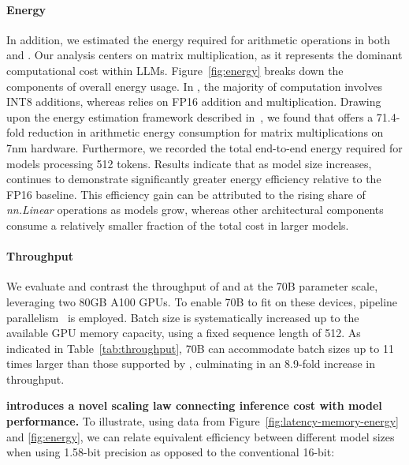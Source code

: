 \paragraph{Energy}

In addition, we estimated the energy required for arithmetic operations in both  and . Our analysis centers on matrix multiplication, as it represents the dominant computational cost within LLMs. Figure~\ref{fig:energy} breaks down the components of overall energy usage. In , the majority of computation involves INT8 additions, whereas  relies on FP16 addition and multiplication. Drawing upon the energy estimation framework described in~\cite{energycost, pokebnn}, we found that  offers a 71.4-fold reduction in arithmetic energy consumption for matrix multiplications on 7nm hardware. Furthermore, we recorded the total end-to-end energy required for models processing 512 tokens. Results indicate that as model size increases,  continues to demonstrate significantly greater energy efficiency relative to the FP16  baseline. This efficiency gain can be attributed to the rising share of \emph{nn.Linear} operations as models grow, whereas other architectural components consume a relatively smaller fraction of the total cost in larger models.

\paragraph{Throughput}

We evaluate and contrast the throughput of  and  at the 70B parameter scale, leveraging two 80GB A100 GPUs. To enable  70B to fit on these devices, pipeline parallelism~\cite{gpipe} is employed. Batch size is systematically increased up to the available GPU memory capacity, using a fixed sequence length of 512. As indicated in Table~\ref{tab:throughput},  70B can accommodate batch sizes up to 11 times larger than those supported by , culminating in an 8.9-fold increase in throughput.

\textbf{ introduces a novel scaling law connecting inference cost with model performance.} To illustrate, using data from Figure~\ref{fig:latency-memory-energy} and \ref{fig:energy}, we can relate equivalent efficiency between different model sizes when using 1.58-bit precision as opposed to the conventional 16-bit:

